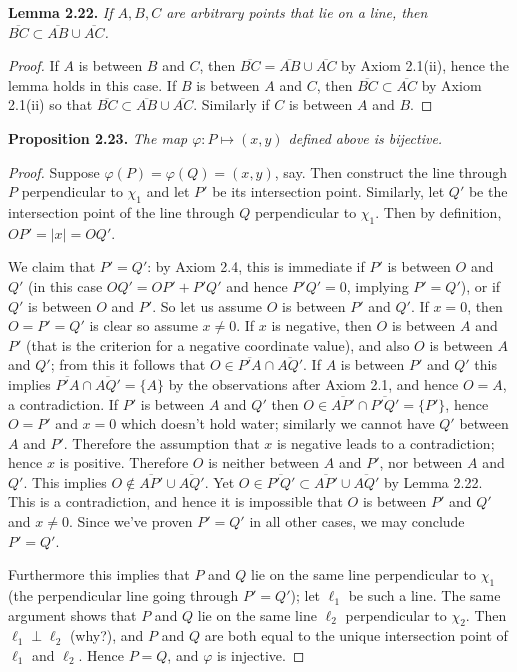 \documentclass[leqno]{book}
\begin{document}
\noindent\textbf{Lemma 2.22.} \emph{If $A,B,C$ are arbitrary points that lie on a line, then $\overline{BC}\subset\overline{AB}\cup\overline{AC}$.}
\begin{proof}
If $A$ is between $B$ and $C$, then $\overline{BC}=\overline{AB}\cup\overline{AC}$ by Axiom 2.1(ii), hence the lemma holds in this case.  If $B$ is between $A$ and $C$, then $\overline{BC}\subset\overline{AC}$ by Axiom 2.1(ii) so that $\overline{BC}\subset\overline{AB}\cup\overline{AC}$.  Similarly if $C$ is between $A$ and $B$.
\end{proof}
\noindent\textbf{Proposition 2.23.} \emph{The map $\varphi:P\mapsto(x,y)$ defined above is bijective.}
\begin{proof}
Suppose $\varphi(P)=\varphi(Q)=(x,y)$, say.  Then construct the line through $P$ perpendicular to $\chi_1$ and let $P'$ be its intersection point.  Similarly, let $Q'$ be the intersection point of the line through $Q$ perpendicular to $\chi_1$.  Then by definition, $OP'=|x|=OQ'$.

We claim that $P'=Q'$: by Axiom 2.4, this is immediate if $P'$ is between $O$ and $Q'$ (in this case $OQ'=OP'+P'Q'$ and hence $P'Q'=0$, implying $P'=Q'$), or if $Q'$ is between $O$ and $P'$.  So let us assume $O$ is between $P'$ and $Q'$.  If $x=0$, then $O=P'=Q'$ is clear so assume $x\ne 0$.  If $x$ is negative, then $O$ is between $A$ and $P'$ (that is the criterion for a negative coordinate value), and also $O$ is between $A$ and $Q'$; from this it follows that $O\in\overline{P'A}\cap\overline{AQ'}$.  If $A$ is between $P'$ and $Q'$ this implies $\overline{P'A}\cap\overline{AQ'}=\{A\}$ by the observations after Axiom 2.1, and hence $O=A$, a contradiction.  If $P'$ is between $A$ and $Q'$ then $O\in\overline{AP'}\cap\overline{P'Q'}=\{P'\}$, hence $O=P'$ and $x=0$ which doesn't hold water; similarly we cannot have $Q'$ between $A$ and $P'$.  Therefore the assumption that $x$ is negative leads to a contradiction; hence $x$ is positive.  Therefore $O$ is neither between $A$ and $P'$, nor between $A$ and $Q'$.  This implies $O\notin\overline{AP'}\cup\overline{AQ'}$.  Yet $O\in\overline{P'Q'}\subset\overline{AP'}\cup\overline{AQ'}$ by Lemma 2.22.  This is a contradiction, and hence it is impossible that $O$ is between $P'$ and $Q'$ and $x\ne 0$.  Since we've proven $P'=Q'$ in all other cases, we may conclude $P'=Q'$.

Furthermore this implies that $P$ and $Q$ lie on the same line perpendicular to $\chi_1$ (the perpendicular line going through $P'=Q'$); let $\ell_1$ be such a line.  The same argument shows that $P$ and $Q$ lie on the same line $\ell_2$ perpendicular to $\chi_2$.  Then $\ell_1\perp\ell_2$ (why?), and $P$ and $Q$ are both equal to the unique intersection point of $\ell_1$ and $\ell_2$.  Hence $P=Q$, and $\varphi$ is injective.


\end{proof}
\end{document}

